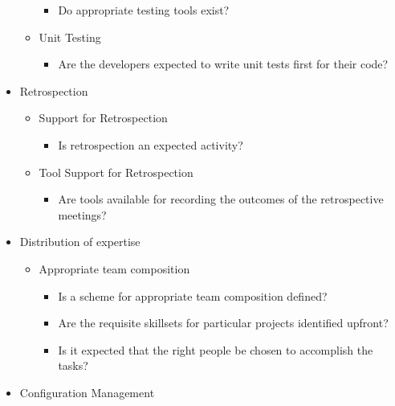 \begin{appendices}
\begin{itemize}
\begin{itemize}
				\begin{itemize}
					\item Do appropriate testing tools exist?
				\end{itemize}
		\end{itemize}
		\begin{itemize}
			\item Unit Testing
				\begin{itemize}
					\item Are the developers expected to write unit tests first for their code?
				\end{itemize}
		\end{itemize}
	\item Retrospection
		\begin{itemize}
			\item Support for Retrospection
				\begin{itemize}
					\item Is retrospection an expected activity?
				\end{itemize}
		\end{itemize}
		\begin{itemize}
			\item Tool Support for Retrospection
				\begin{itemize}
					\item Are tools available for recording the outcomes of the retrospective meetings?
				\end{itemize}
		\end{itemize}
	\item Distribution of expertise
		\begin{itemize}
			\item Appropriate team composition
				\begin{itemize}
					\item Is a scheme for appropriate team composition defined?
					\item Are the requisite skillsets for particular projects identified upfront?
					\item Is it expected that the right people be chosen to accomplish the tasks?
				\end{itemize}
		\end{itemize}
	\item Configuration Management

\end{itemize}
\end{appendices}
